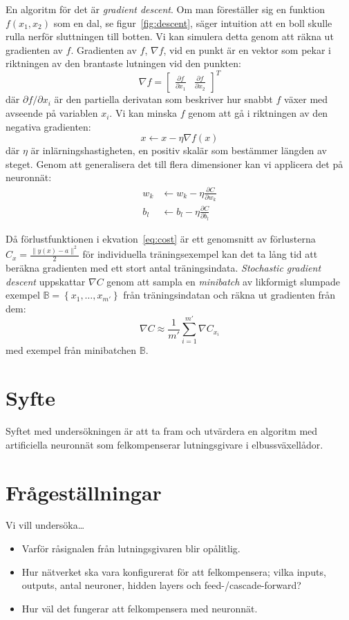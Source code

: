 En algoritm för det är \emph{gradient descent}.
Om man föreställer sig en funktion $ f(x_1, x_2) $ som en dal,
se figur~\ref{fig:descent},
säger intuition att en boll skulle rulla nerför sluttningen till botten.
Vi kan simulera detta genom att räkna ut gradienten av $ f $.
Gradienten av $ f $, $ \nabla f $, vid en punkt är en vektor
som pekar i riktningen av den brantaste lutningen vid den punkten:
\begin{equation}
	\nabla f = \begin{bmatrix} \frac{\partial f}{\partial x_1} & \frac{\partial f}{\partial x_2} \end{bmatrix}^{T}
\end{equation}
där $ \partial f / \partial x_i $ är den partiella derivatan
som beskriver hur snabbt $ f $ växer med avseende på variablen $ x_i $.
Vi kan minska $ f $ genom att gå i riktningen av den negativa gradienten:
\begin{equation}
	x \leftarrow x - \eta \nabla f(x)
\end{equation}
där $ \eta $ är inlärningshastigheten,
en positiv skalär som bestämmer längden av steget.
Genom att generalisera det till flera dimensioner kan vi
applicera det på neuronnät:
\begin{align}
	w_k &\leftarrow w_k - \eta \frac{\partial C}{\partial w_k} \\
	b_l &\leftarrow b_l - \eta \frac{\partial C}{\partial b_l}
\end{align}

Då förlustfunktionen i ekvation~\eqref{eq:cost} är ett genomsnitt av
förlusterna $ C_x = \frac{\lVert y(x) - a \rVert^2}{2} $ för individuella träningsexempel
kan det ta lång tid att beräkna gradienten med ett stort antal träningsindata.
\emph{Stochastic gradient descent} uppskattar $ \nabla C $ genom att
sampla en \emph{minibatch} av likformigt slumpade exempel
$ \mathbb{B} = \left\{ x_1, \dotsc, x_{m'} \right\} $ från träningsindatan
och räkna ut gradienten från dem:
\begin{equation}
	\nabla C \approx \frac{1}{m'} \sum^{m'}_{i=1} \nabla C_{x_i}
\end{equation}
med exempel från minibatchen $ \mathbb{B} $.
\autocite{nielsen15}

\section{Syfte}
Syftet med undersökningen är att ta fram och utvärdera en algoritm med
artificiella neuronnät som felkompenserar lutningsgivare i elbussväxellådor.

\section{Frågeställningar}
Vi vill undersöka\ldots
\begin{itemize}
	\item Varför råsignalen från lutningsgivaren blir opålitlig.
	\item Hur nätverket ska vara konfigurerat för att felkompensera; vilka inputs,
		outputs, antal neuroner, hidden layers och feed-/cascade-forward?
	\item Hur väl det fungerar att felkompensera med neuronnät.
\end{itemize}
